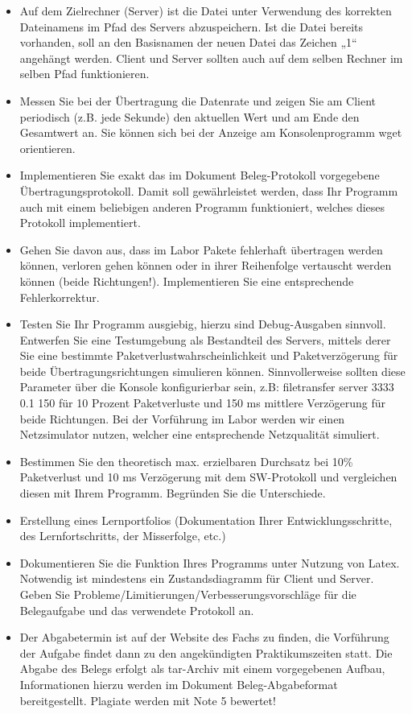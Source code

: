 \documentclass{article}
\begin{document}
\begin{itemize}
        \item Auf dem Zielrechner (Server) ist die Datei unter Verwendung des korrekten Dateinamens im Pfad des Servers abzuspeichern. Ist die Datei bereits vorhanden, soll an den Basisnamen der neuen Datei das Zeichen „1“ angehängt werden. Client und Server sollten auch auf dem selben Rechner im selben Pfad funktionieren.
        \item Messen Sie bei der Übertragung die Datenrate und zeigen Sie am Client periodisch (z.B. jede Sekunde) den aktuellen Wert und am Ende den Gesamtwert an. Sie können sich bei der Anzeige am Konsolenprogramm wget orientieren.
        \item Implementieren Sie exakt das im Dokument Beleg-Protokoll vorgegebene Übertragungsprotokoll. Damit soll gewährleistet werden, dass Ihr Programm auch mit einem beliebigen anderen Programm funktioniert, welches dieses Protokoll implementiert.
        \item Gehen Sie davon aus, dass im Labor Pakete fehlerhaft übertragen werden können, verloren gehen können oder in ihrer Reihenfolge vertauscht werden können (beide Richtungen!). Implementieren Sie eine entsprechende Fehlerkorrektur.
        \item Testen Sie Ihr Programm ausgiebig, hierzu sind Debug-Ausgaben sinnvoll. Entwerfen Sie eine Testumgebung als Bestandteil des Servers, mittels derer Sie eine bestimmte Paketverlustwahrscheinlichkeit und Paketverzögerung für beide Übertragungsrichtungen simulieren können. Sinnvollerweise sollten diese Parameter über die Konsole konfigurierbar sein, z.B: filetransfer server 3333 0.1 150 für 10 Prozent Paketverluste und 150 ms mittlere Verzögerung für beide Richtungen. Bei der Vorführung im Labor werden wir einen Netzsimulator nutzen, welcher eine entsprechende Netzqualität simuliert.
        \item Bestimmen Sie den theoretisch max. erzielbaren Durchsatz bei 10\% Paketverlust und 10 ms Verzögerung mit dem SW-Protokoll und vergleichen diesen mit Ihrem Programm. Begründen Sie die Unterschiede.
        \item Erstellung eines Lernportfolios (Dokumentation Ihrer Entwicklungsschritte, des Lernfortschritts, der Misserfolge, etc.)
        \item Dokumentieren Sie die Funktion Ihres Programms unter Nutzung von Latex. Notwendig ist mindestens ein Zustandsdiagramm für Client und Server. Geben Sie Probleme/Limitierungen/Verbesserungsvorschläge für die Belegaufgabe und das verwendete Protokoll an.
        \item Der Abgabetermin ist auf der Website des Fachs zu finden, die Vorführung der Aufgabe findet dann zu den angekündigten Praktikumszeiten statt. Die Abgabe des Belegs erfolgt als tar-Archiv mit einem vorgegebenen Aufbau, Informationen hierzu werden im Dokument Beleg-Abgabeformat bereitgestellt. Plagiate werden mit Note 5 bewertet!

\end{itemize}
\end{document}
